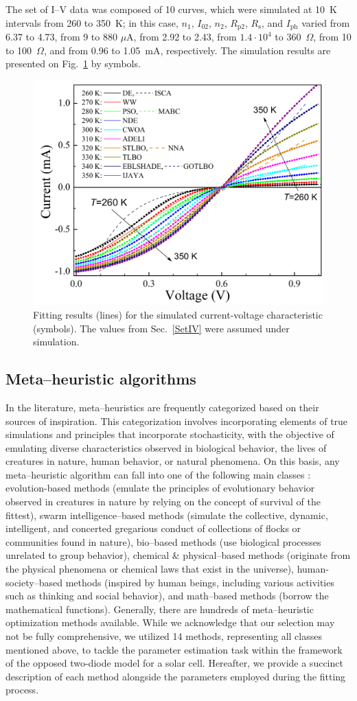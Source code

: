 \documentclass[a4paper,fleqn]{cas-sc}
\begin{document}
The set of I–V data was composed of 10 curves,
which were simulated at 10~K intervals from 260 to 350~K;
in this case,
$n_1$,
$I_{02}$,
$n_2$,
$R_\mathrm{p2}$,
$R_\mathrm{s}$,
and $I_\mathrm{ph}$
varied
from 6.37 to 4.73,
from 9 to 880 $\mu$A,
from 2.92 to 2.43,
from $1.4\cdot10^4$ to 360~$\Omega$,
from 10 to 100~$\Omega$,
and from 0.96 to 1.05~mA, respectively.
The simulation results are presented on Fig.~\ref{figSetIV} by symbols.
\begin{figure}[]
	\centering
		\includegraphics[width=0.5\columnwidth]{IVset}
	  \caption{Fitting results (lines) for the simulated current-voltage characteristic (symbols).
             The values from  Sec.~\ref{SetIV} were assumed under simulation.}\label{figSetIV}
\end{figure}


\subsection{Meta--heuristic algorithms}\label{MHA}
In the literature, meta--heuristics are frequently categorized based on their sources of inspiration.
This categorization involves incorporating elements of true simulations and principles that incorporate stochasticity,
with the objective of emulating diverse characteristics observed in biological behavior, the lives of creatures in nature, human behavior, or natural phenomena.
On this basis, any meta--heuristic algorithm can fall into one of the following main classes \cite{WhiteShark,Gannet,Dandelion}:
evolution-based methods (emulate the principles of evolutionary behavior observed in creatures in nature by relying on the concept of survival of the fittest),
swarm intelligence--based methods (simulate the collective, dynamic, intelligent, and concerted gregarious conduct of collections of flocks or communities found in nature),
bio--based methods (use biological processes unrelated to group behavior),
chemical \& physical--based methods (originate from the physical phenomena or chemical laws that exist in the universe),
human-society--based methods (inspired by human beings, including various activities such as thinking and social behavior),
and math--based methods (borrow the mathematical functions).
Generally, there are hundreds of meta--heuristic optimization methods available.
While we acknowledge that our selection may not be fully comprehensive,
we utilized 14 methods, representing all classes mentioned above,
to tackle the parameter estimation task within the framework of the opposed two-diode model for a solar cell.
Hereafter, we provide a succinct description of each method alongside the parameters employed during the fitting process.
\end{document}
